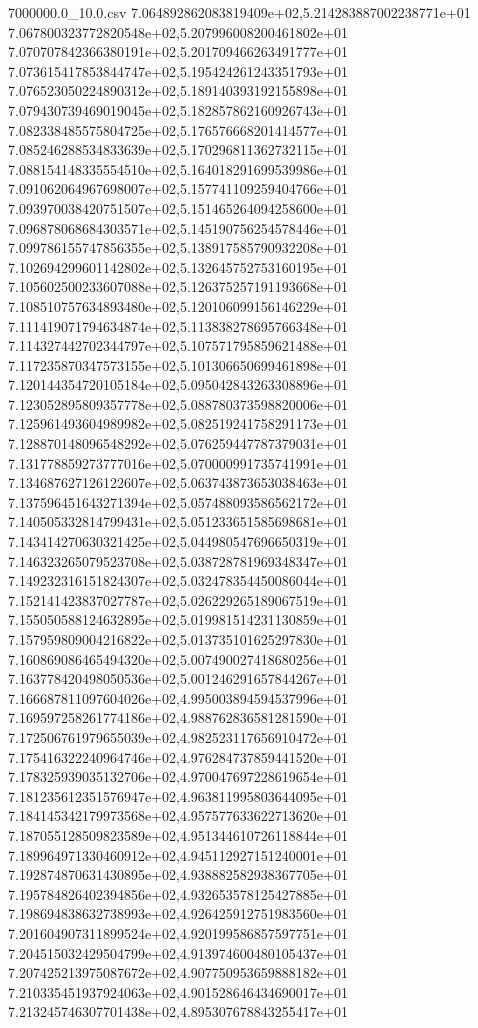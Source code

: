 \begin{filecontents*}{7000000.0_10.0.csv}
7.064892862083819409e+02,5.214283887002238771e+01
7.067800323772820548e+02,5.207996008200461802e+01
7.070707842366380191e+02,5.201709466263491777e+01
7.073615417853844747e+02,5.195424261243351793e+01
7.076523050224890312e+02,5.189140393192155898e+01
7.079430739469019045e+02,5.182857862160926743e+01
7.082338485575804725e+02,5.176576668201414577e+01
7.085246288534833639e+02,5.170296811362732115e+01
7.088154148335554510e+02,5.164018291699539986e+01
7.091062064967698007e+02,5.157741109259404766e+01
7.093970038420751507e+02,5.151465264094258600e+01
7.096878068684303571e+02,5.145190756254578446e+01
7.099786155747856355e+02,5.138917585790932208e+01
7.102694299601142802e+02,5.132645752753160195e+01
7.105602500233607088e+02,5.126375257191193668e+01
7.108510757634893480e+02,5.120106099156146229e+01
7.111419071794634874e+02,5.113838278695766348e+01
7.114327442702344797e+02,5.107571795859621488e+01
7.117235870347573155e+02,5.101306650699461898e+01
7.120144354720105184e+02,5.095042843263308896e+01
7.123052895809357778e+02,5.088780373598820006e+01
7.125961493604989982e+02,5.082519241758291173e+01
7.128870148096548292e+02,5.076259447787379031e+01
7.131778859273777016e+02,5.070000991735741991e+01
7.134687627126122607e+02,5.063743873653038463e+01
7.137596451643271394e+02,5.057488093586562172e+01
7.140505332814799431e+02,5.051233651585698681e+01
7.143414270630321425e+02,5.044980547696650319e+01
7.146323265079523708e+02,5.038728781969348347e+01
7.149232316151824307e+02,5.032478354450086044e+01
7.152141423837027787e+02,5.026229265189067519e+01
7.155050588124632895e+02,5.019981514231130859e+01
7.157959809004216822e+02,5.013735101625297830e+01
7.160869086465494320e+02,5.007490027418680256e+01
7.163778420498050536e+02,5.001246291657844267e+01
7.166687811097604026e+02,4.995003894594537996e+01
7.169597258261774186e+02,4.988762836581281590e+01
7.172506761979655039e+02,4.982523117656910472e+01
7.175416322240964746e+02,4.976284737859441520e+01
7.178325939035132706e+02,4.970047697228619654e+01
7.181235612351576947e+02,4.963811995803644095e+01
7.184145342179973568e+02,4.957577633622713620e+01
7.187055128509823589e+02,4.951344610726118844e+01
7.189964971330460912e+02,4.945112927151240001e+01
7.192874870631430895e+02,4.938882582938367705e+01
7.195784826402394856e+02,4.932653578125427885e+01
7.198694838632738993e+02,4.926425912751983560e+01
7.201604907311899524e+02,4.920199586857597751e+01
7.204515032429504799e+02,4.913974600480105437e+01
7.207425213975087672e+02,4.907750953659888182e+01
7.210335451937924063e+02,4.901528646434690017e+01
7.213245746307701438e+02,4.895307678843255417e+01

\end{filecontents*}
